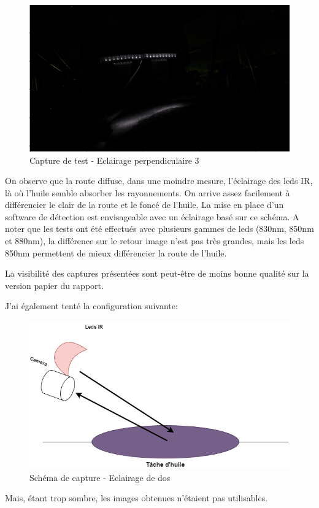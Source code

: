 \begin{figure}[H]
    \centering
    \includegraphics[width=13cm]{assets/figures/eclairage_perpendiculaire3.png}
    \caption{Capture de test - Eclairage perpendiculaire 3}
\end{figure}
\newpage
On observe que la route diffuse, dans une moindre mesure, l'éclairage des leds IR, là où l'huile semble absorber les rayonnements. On arrive
assez facilement à différencier le clair de la route et le foncé de l'huile. La mise en place d'un software de détection est envisageable avec
un éclairage basé sur ce schéma. A noter que les tests ont été effectués avec plusieurs gammes de leds (830nm, 850nm et 880nm), la différence
sur le retour image n'est pas très grandes, mais les leds 850nm permettent de mieux différencier la route de l'huile.

La visibilité des captures présentées sont peut-être de moins bonne qualité sur la version papier du rapport.

J'ai également tenté la configuration suivante:
\begin{figure}[H]
    \centering
    \includegraphics[width=13cm]{assets/figures/eclairage_dos.png}
    \caption{Schéma de capture - Eclairage de dos}
\end{figure}
Mais, étant trop sombre, les images obtenues n'étaient pas utilisables.
\newpage
